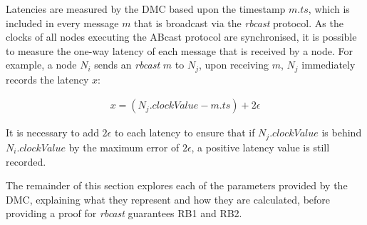         Latencies are measured by the DMC based upon the timestamp $m.ts$, which is included in every message $m$ that is broadcast via the \emph{rbcast} protocol.  As the clocks of all nodes executing the \textsf{ABcast} protocol are synchronised, it is possible to measure the one-way latency of each message that is received by a node.  For example, a node $N_i$ sends an \emph{rbcast} $m$ to $N_j$, upon receiving $m$, $N_j$ immediately records the latency $x$:

        \begin{equation}
             \begin{aligned}
                 x = (N_j.clockValue - m.ts) + 2\epsilon
             \end{aligned}
        \end{equation}        
        
        It is necessary to add $2\epsilon$ to each latency to ensure that if $N_j.clockValue$ is behind $N_i.clockValue$ by the maximum error of $2\epsilon$, a positive latency value is still recorded.  
                                
        The remainder of this section explores each of the parameters provided by the DMC, explaining what they represent and how they are calculated, before providing a proof for \emph{rbcast} guarantees RB1 and RB2.  
        
